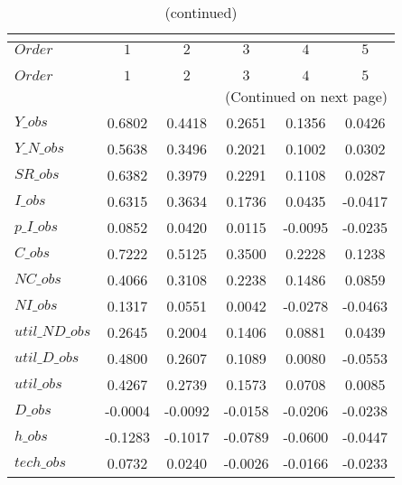  
\begin{center}
\begin{longtable}{lccccc} 
\caption{COEFFICIENTS OF AUTOCORRELATION}\\
 \label{Table:th_autocorr_matrix}\\
\toprule 
$Order          $	 & 	 $          1$	 & 	 $          2$	 & 	 $          3$	 & 	 $          4$	 & 	 $          5$\\
\midrule \endfirsthead 
\caption{(continued)}\\
 \toprule \\ 
$Order          $	 & 	 $          1$	 & 	 $          2$	 & 	 $          3$	 & 	 $          4$	 & 	 $          5$\\
\midrule \endhead 
\midrule \multicolumn{6}{r}{(Continued on next page)} \\ \bottomrule \endfoot 
\bottomrule \endlastfoot 
$Y\_obs         $	 & 	     0.6802	 & 	     0.4418	 & 	     0.2651	 & 	     0.1356	 & 	     0.0426 \\ 
$Y\_N\_obs      $	 & 	     0.5638	 & 	     0.3496	 & 	     0.2021	 & 	     0.1002	 & 	     0.0302 \\ 
$SR\_obs        $	 & 	     0.6382	 & 	     0.3979	 & 	     0.2291	 & 	     0.1108	 & 	     0.0287 \\ 
$I\_obs         $	 & 	     0.6315	 & 	     0.3634	 & 	     0.1736	 & 	     0.0435	 & 	    -0.0417 \\ 
$p\_I\_obs      $	 & 	     0.0852	 & 	     0.0420	 & 	     0.0115	 & 	    -0.0095	 & 	    -0.0235 \\ 
$C\_obs         $	 & 	     0.7222	 & 	     0.5125	 & 	     0.3500	 & 	     0.2228	 & 	     0.1238 \\ 
$NC\_obs        $	 & 	     0.4066	 & 	     0.3108	 & 	     0.2238	 & 	     0.1486	 & 	     0.0859 \\ 
$NI\_obs        $	 & 	     0.1317	 & 	     0.0551	 & 	     0.0042	 & 	    -0.0278	 & 	    -0.0463 \\ 
$util\_ND\_obs  $	 & 	     0.2645	 & 	     0.2004	 & 	     0.1406	 & 	     0.0881	 & 	     0.0439 \\ 
$util\_D\_obs   $	 & 	     0.4800	 & 	     0.2607	 & 	     0.1089	 & 	     0.0080	 & 	    -0.0553 \\ 
$util\_obs      $	 & 	     0.4267	 & 	     0.2739	 & 	     0.1573	 & 	     0.0708	 & 	     0.0085 \\ 
$D\_obs         $	 & 	    -0.0004	 & 	    -0.0092	 & 	    -0.0158	 & 	    -0.0206	 & 	    -0.0238 \\ 
$h\_obs         $	 & 	    -0.1283	 & 	    -0.1017	 & 	    -0.0789	 & 	    -0.0600	 & 	    -0.0447 \\ 
$tech\_obs      $	 & 	     0.0732	 & 	     0.0240	 & 	    -0.0026	 & 	    -0.0166	 & 	    -0.0233 \\ 
\end{longtable}
 \end{center}
